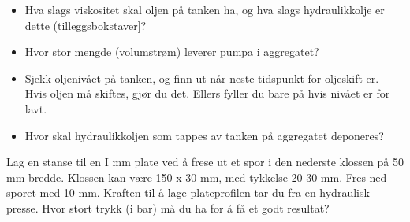 \documentclass[12pt,a4paper]{article}
\def\oppgave{
		}
\begin{document}
\begin{itemize}
	\item Hva slags viskositet skal oljen på tanken ha, og hva slags hydraulikkolje er dette (tilleggsbokstaver]?
	\item Hvor stor mengde (volumstrøm) leverer pumpa i aggregatet?
	\item Sjekk oljenivået på tanken, og finn ut når neste tidspunkt for oljeskift er. Hvis oljen må skiftes, gjør du det. Ellers fyller du bare på hvis nivået er for lavt.
	\item Hvor skal hydraulikkoljen som tappes av tanken på aggregatet deponeres?
\end{itemize}
\vskip 5pt 
\vskip 2.5pt 
\oppgave{}%
\vskip 2.5pt 
Lag en stanse til en I mm plate ved å frese ut et spor i den nederste
klossen på 50 mm bredde. Klossen kan være 150 x 30 mm, med
tykkelse 20-30 mm. Fres ned sporet med 10 mm. Kraften til å lage
plateprofilen tar du fra en hydraulisk presse. Hvor stort trykk (i bar)
må du ha for å få et godt resultat?

\vskip 5pt 
\vskip 2.5pt 
\end{document}
